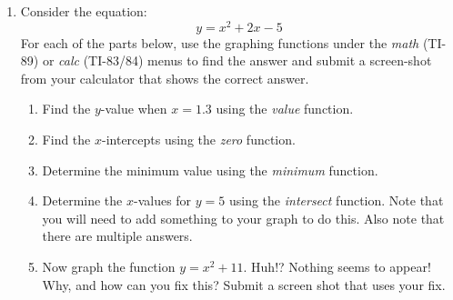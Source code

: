 \documentclass[letterpaper,12pt,fleqn]{article}
\begin{document}
\begin{enumerate}
\newpage

\item Consider the equation:
\[y=x^2+2x-5\]
For each of the parts below, use the graphing functions under the \emph{math}
(TI-89) or \emph{calc} (TI-83/84) menus to find the answer and submit a
screen-shot from your calculator that shows the correct answer.
\begin{enumerate}
\item Find the $y$-value when $x=1.3$ using the \emph{value} function.
\item Find the $x$-intercepts using the \emph{zero} function.
\item Determine the minimum value using the \emph{minimum} function.
\item Determine the $x$-values for $y=5$ using the \emph{intersect} function.
Note that you will need to add something to your graph to do this. Also note
that there are multiple answers.
\item Now graph the function $y=x^2+11$. Huh!? Nothing seems to appear! Why,
and how can you fix this? Submit a screen shot that uses your fix.
\end{enumerate}
\end{enumerate}
\end{document}

